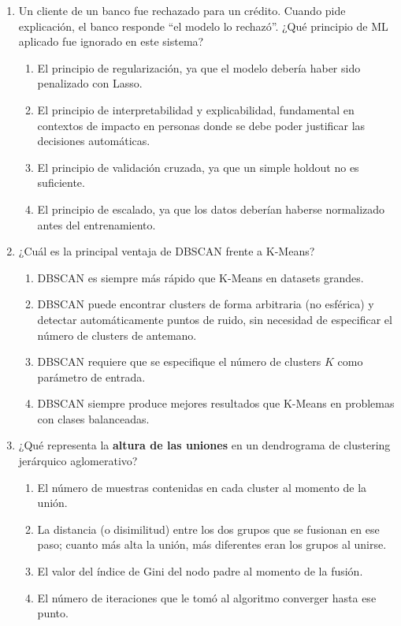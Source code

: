 \documentclass[11pt,a4paper]{article}
\begin{document}
\begin{enumerate}[label=\textbf{\arabic*.}, leftmargin=*, itemsep=20pt]
\item Un cliente de un banco fue rechazado para un cr\'edito. Cuando pide explicaci\'on, el banco responde ``el modelo lo rechaz\'o''. ¿Qu\'e principio de ML aplicado fue ignorado en este sistema?

\begin{enumerate}[label=\alph*)]
  \item El principio de regularizaci\'on, ya que el modelo deber\'ia haber sido penalizado con Lasso.
  \item El principio de interpretabilidad y explicabilidad, fundamental en contextos de impacto en personas donde se debe poder justificar las decisiones autom\'aticas.
  \item El principio de validaci\'on cruzada, ya que un simple holdout no es suficiente.
  \item El principio de escalado, ya que los datos deber\'ian haberse normalizado antes del entrenamiento.
\end{enumerate}

\item ¿Cu\'al es la principal ventaja de DBSCAN frente a K-Means?

\begin{enumerate}[label=\alph*)]
  \item DBSCAN es siempre m\'as r\'apido que K-Means en datasets grandes.
  \item DBSCAN puede encontrar clusters de forma arbitraria (no esf\'erica) y detectar autom\'aticamente puntos de ruido, sin necesidad de especificar el n\'umero de clusters de antemano.
  \item DBSCAN requiere que se especifique el n\'umero de clusters $K$ como par\'ametro de entrada.
  \item DBSCAN siempre produce mejores resultados que K-Means en problemas con clases balanceadas.
\end{enumerate}

\item ¿Qu\'e representa la \textbf{altura de las uniones} en un dendrograma de clustering jer\'arquico aglomerativo?

\begin{enumerate}[label=\alph*)]
  \item El n\'umero de muestras contenidas en cada cluster al momento de la uni\'on.
  \item La distancia (o disimilitud) entre los dos grupos que se fusionan en ese paso; cuanto m\'as alta la uni\'on, m\'as diferentes eran los grupos al unirse.
  \item El valor del \'indice de Gini del nodo padre al momento de la fusi\'on.
  \item El n\'umero de iteraciones que le tom\'o al algoritmo converger hasta ese punto.
\end{enumerate}


\end{enumerate}
\end{document}
